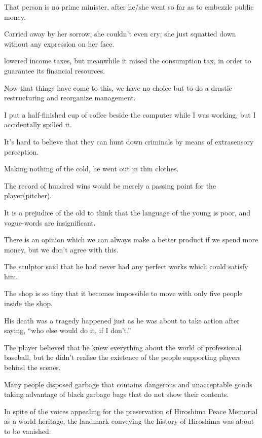 \item[195.] That person is no prime minister, after he/she went so far as to embezzle public money.
\item[196.] Carried away by her sorrow, she couldn't even cry; she just squatted down without any expression on her face.
\item[197.] [The government] lowered income taxes, but meanwhile it raised the consumption tax, in order to guarantee its financial resources.
\item[198.] Now that things have come to this, we have no choice but to do a drastic restructuring and reorganize management.
\item[199.] I put a half-finished cup of coffee beside the computer while I was working, but I accidentally spilled it.
\item[200.] It's hard to believe that they can hunt down criminals by means of extrasensory perception.
\fi
\ifVOLTHREE
\item[201.] Making nothing of the cold, he went out in thin clothes.
\item[202.] The record of hundred wins would be merely a passing point for the player(pitcher).
\item[203.] It is a prejudice of the old to think that the language of the young is poor, and vogue-words are insignificant.
\item[204.] There is an opinion which we can always make a better product if we spend more money, but we don't agree with this.
\item[205.] The sculptor said that he had never had any perfect works which could satisfy him.
\item[206.] The shop is so tiny that it becomes impossible to move with only five people inside the shop.
\item[207.] His death was a tragedy happened just as he was about to take action after saying, ``who else would do it, if I don't.''
\item[208.] The player believed that he knew everything about the world of professional baseball, but he didn't realise the existence of the people supporting players behind the scenes.
\item[209.] Many people disposed garbage that contains dangerous and unacceptable goods taking advantage of black garbage bags that do not show their contents.
\item[210.] In spite of the voices appealing for the preservation of Hiroshima Peace Memorial as a world heritage, the landmark conveying the history of Hiroshima was about to be vanished.
